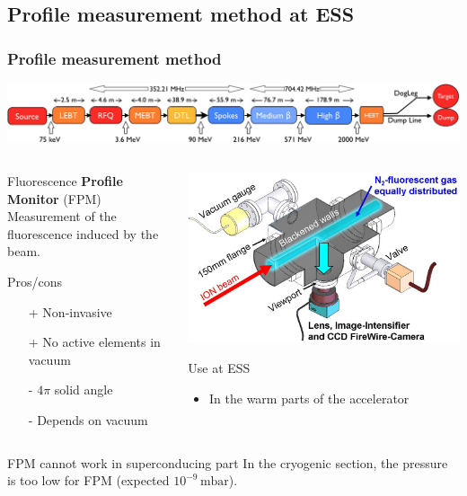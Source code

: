 \subsection{Profile measurement method at ESS}
\begin{frame}
  \frametitle{Profile measurement method}
  \includegraphics[width=\textwidth]{01_Neutron/fig/fig000_ESS_acc}
  \begin{columns}
    \begin{column}{0.45\textwidth}
      \begin{block}{Fluorescence \textbf{Profile Monitor} (FPM)}
        Measurement of the fluorescence induced by the beam.
      \end{block}
      \begin{block}{Pros/cons}
        \begin{itemize}
          \item[+] Non-invasive
          \item[+] No active elements in vacuum
          \item[-] $4\pi$ solid angle
          \item[-] Depends on vacuum
        \end{itemize}
      \end{block}
    \end{column}
    \begin{column}{0.45\textwidth}
      \includegraphics[width=\textwidth]{02_ESS/fig/fig000_FPM}

      \begin{block}{Use at ESS}
        \begin{itemize}
          \item In the warm parts of the accelerator
        \end{itemize}
      \end{block}
    \end{column}
  \end{columns}
  \begin{alertblock}{FPM cannot work in superconducing part}
    In the cryogenic section, the pressure is too low for FPM (expected $10^{-9}\,\mathrm{mbar}$).
  \end{alertblock}
\end{frame}

